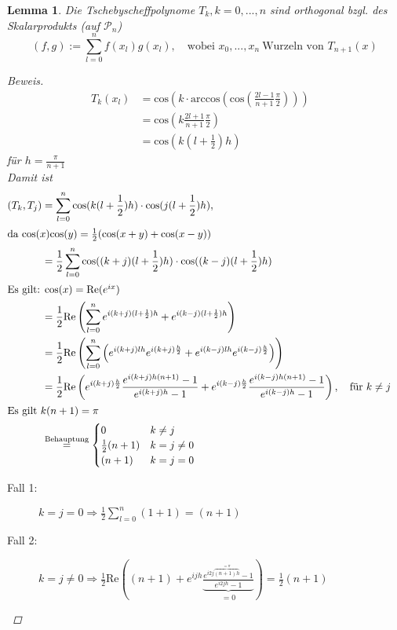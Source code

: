 \documentclass[12pt]{article}
\theoremstyle{break}
\newtheorem{lemma}[theorem]{Lemma}
\begin{document}
\begin{lemma}
Die Tschebyscheffpolynome $T_k, k = 0, ..., n$ sind orthogonal bzgl. des Skalarprodukts (auf $\mathcal{P}_n$)
\[(f, g) := \sum_{l=0}^n f(x_l)g(x_l), \quad \text{wobei } x_0, ..., x_n \medspace \text{Wurzeln von } T_{n+1}(x) \]

\begin{proof}[Beweis]\leavevmode
\begin{align*}
T_k(x_l) &= \text{cos}(k \cdot \text{arccos}( \text{cos} ( \frac{2l-1}{n+1} \frac{\pi}{2}))) &\\
&= \text{cos}( k \frac{2l+1}{n+1} \frac{\pi}{2}) &\\
&= \text{cos}(k (l+ \frac{1}{2})h )
\end{align*}
für $h = \frac{\pi}{n+1}$\\
Damit ist 
\begin{align*}
(T_k, T_j) &= \sum_{l=0}^n \text{cos}(k(l+\frac{1}{2})h) \cdot \text{cos}(j(l+\frac{1}{2})h), &\\
\intertext{da $\text{cos}(x)\text{cos}(y) = \frac{1}{2}(\text{cos}(x+y) + \text{cos}(x-y))$}
&= \frac{1}{2} \sum_{l=0}^n \text{cos}((k+j)(l+\frac{1}{2})h) \cdot \text{cos}((k-j)(l+\frac{1}{2})h) &\\
\intertext{Es gilt: $\text{cos}(x) = \text{Re} (e^{ix})$}
&= \frac{1}{2} \text{Re}\left( \sum_{l=0}^n e^{i(k+j)(l+\frac{1}{2})h} + e^{i(k-j)(l+\frac{1}{2})h}\right) &\\
&= \frac{1}{2} \text{Re}\left( \sum_{l=0}^n \left( e^{i(k+j)lh}e^{i(k+j)\frac{h}{2}} + e^{i(k-j)lh}e^{i(k-j)\frac{h}{2}}\right)\right) &\\
&= \frac{1}{2} \text{Re} \left( e^{i(k+j)\frac{h}{2}} \frac{e^{i(k+j)h(n+1)} -1}{ e^{i(k+j)h} - 1} + e^{i(k-j)\frac{h}{2}} \frac{e^{i(k-j)h(n+1)} -1}{ e^{i(k-j)h} - 1}\right), \quad \text{für }k \neq j &\\
\intertext{Es gilt $k(n+1) = \pi$}
&\overset{\text{Behauptung}}{=} \begin{cases}
0 & k \neq j \\
\frac{1}{2} (n+1) & k=j\neq 0 \\
(n+1) & k = j = 0
\end{cases}
\end{align*}
\begin{description}
  \item[Fall 1:] $k=j=0 \Rightarrow \frac{1}{2} \sum_{l=0}^n(1+1) = (n+1)$
  \item[Fall 2:] $k=j\neq0 \Rightarrow \frac{1}{2} \text{Re} \left( (n+1) + e^{ijh} \underbrace{\frac{e^{i2j\overbrace{(n+1)h}^{= \pi}}-1}{e^{i2jh}-1}}_{=0}\right) = \frac{1}{2} (n+1)$ 

\end{description}
\end{proof}
\end{lemma}
\end{document}

